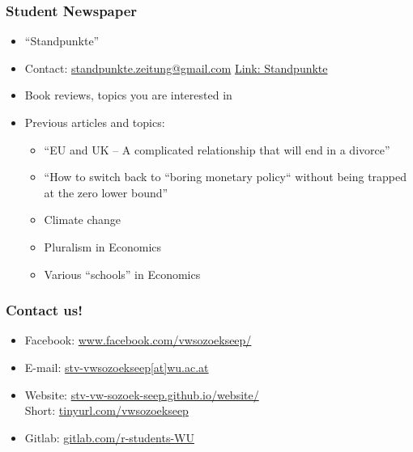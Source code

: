 \documentclass{beamer}
\begin{document}
\begin{frame}
  \frametitle{Student Newspaper}
  \begin{itemize}
  \item ``Standpunkte''
  \item Contact: \href{mailto:standpunkte.zeitung@gmail.com}{standpunkte.zeitung@gmail.com}
    \href{https://www.wu.ac.at/economics/vw-zentrum/standpunkte/}{Link: Standpunkte}
  \item Book reviews, topics you are interested in
  \item Previous articles and topics:
    \begin{itemize}
    \item ``EU and UK – A complicated relationship that will end in a divorce''
    \item ``How to switch back to “boring monetary policy“ without being trapped at the zero lower bound''
    \item Climate change
    \item Pluralism in Economics
    \item Various ``schools'' in Economics
    \end{itemize}
  \end{itemize}
\end{frame}
\begin{frame}
  \frametitle{Contact us!}
  \begin{itemize}
  \item Facebook: \href{https://www.facebook.com/vwsozoekseep/}{www.facebook.com/vwsozoekseep/}
  \item E-mail: \href{mailto:stv-vwsozoekseep@wu.ac.at}{stv-vwsozoekseep[at]wu.ac.at}
  \item Website: \href{https://stv-vw-sozoek-seep.github.io/website/}{stv-vw-sozoek-seep.github.io/website/} \\
    Short: \href{https://tinyurl.com/vwsozoekseep}{tinyurl.com/vwsozoekseep}
  \item Gitlab: \href{https://gitlab.com/r-students-WU}{gitlab.com/r-students-WU}
  \end{itemize} 
\end{frame}
\end{document}
